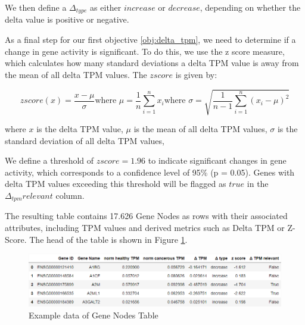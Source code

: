 We then define a $\Delta_{type}$ as either $increase$ or $decrease$, depending on whether the delta value is positive or negative.

As a final step for our first objective \ref{obj:delta_tpm}, we need to determine if a change in gene activity is significant. %
To do this, we use the z score measure, which calculates how many standard deviations a delta TPM value is away
from the mean of all delta TPM values.
The $z score$ is given by:

\begin{subequations}
\begin{equation} \label{eq:z_score}
z score (x) = \frac{x - {\mu}}{\sigma}
\end{equation}
\begin{equation}
\text{where } \mu = \frac{1}{n} \sum_{i=1}^{n} x_i
\end{equation}
\begin{equation}
\text{where } \sigma = \sqrt{\frac{1}{n-1} \sum_{i=1}^{n} (x_i - \mu)^2}
\end{equation}
\end{subequations}

where $x$ is the delta TPM value, $\mu$ is the mean of all delta TPM values, $\sigma$ is the standard deviation of all delta TPM values,

We define a threshold of  $z score = 1.96$ to indicate significant changes in gene activity,
which corresponds to a confidence level of 95\% (p = 0.05).
Genes with delta TPM values exceeding this threshold will be flagged as $true$ in the $\Delta_{tpm} relevant$ column.

The resulting table contains 17.626 Gene Nodes as rows with their associated attributes,
including TPM values and derived metrics such as Delta TPM or Z-Score.
The head of the table is shown in Figure \ref{fig:03_02_df_gene_nodes}.

\begin{figure}[h]
\centering
\includegraphics[height=\dfheight]{figures/03_02_gene_nodes}
\caption{Example data of Gene Nodes Table}
\label{fig:03_02_df_gene_nodes}
\end{figure}


